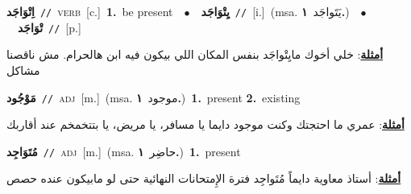 \documentclass[10pt,a4paper,twoside]{article} %
\begin{document}
\begin{multicols}{2}
{{{{{{{{{{\setlength\topsep{0pt}\textbf{\foreignlanguage{arabic}{اِتْوَاجَد}}\ {\color{gray}\texttt{//}\color{black}}\ \textsc{verb}\ [c.]\ \textbf{1.}~be present\ \ $\bullet$\ \ \setlength\topsep{0pt}\textbf{\foreignlanguage{arabic}{يِتْوَاجَد}}\ {\color{gray}\texttt{//}\color{black}}\ [i.]\ \color{gray}(msa. \foreignlanguage{arabic}{يَتَواجَد}~\foreignlanguage{arabic}{\textbf{١.}})\color{black}\ \ $\bullet$\ \ \setlength\topsep{0pt}\textbf{\foreignlanguage{arabic}{تْوَاجَد}}\ {\color{gray}\texttt{//}\color{black}}\ [p.]\  \begin{flushright}\color{gray}\foreignlanguage{arabic}{\textbf{\underline{\foreignlanguage{arabic}{أمثلة}}}: خلي أخوك مايِتْواجَد بنفس المكان اللي بيكون فيه ابن هالحرام. مش ناقصنا مشاكل}\end{flushright}\color{black}} \vspace{2mm}

{\setlength\topsep{0pt}\textbf{\foreignlanguage{arabic}{مَوْجُود}}\ {\color{gray}\texttt{//}\color{black}}\ \textsc{adj}\ [m.]\ \color{gray}(msa. \foreignlanguage{arabic}{موجود}~\foreignlanguage{arabic}{\textbf{١.}})\color{black}\ \textbf{1.}~present  \textbf{2.}~existing\  \begin{flushright}\color{gray}\foreignlanguage{arabic}{\textbf{\underline{\foreignlanguage{arabic}{أمثلة}}}: عمري ما احتجتك وكنت موجود دايما يا مسافر، يا مريض، يا بتتخمخم عند أقاربك}\end{flushright}\color{black}} \vspace{2mm}

{\setlength\topsep{0pt}\textbf{\foreignlanguage{arabic}{مُتَوَاجِد}}\ {\color{gray}\texttt{//}\color{black}}\ \textsc{adj}\ [m.]\ \color{gray}(msa. \foreignlanguage{arabic}{حاضِر}~\foreignlanguage{arabic}{\textbf{١.}})\color{black}\ \textbf{1.}~present\  \begin{flushright}\color{gray}\foreignlanguage{arabic}{\textbf{\underline{\foreignlanguage{arabic}{أمثلة}}}: أستاذ معاوية دايماً مُتَواجِد فترة الإِمتحانات النهائية حتى لو مابيكون عنده حصص}\end{flushright}\color{black}} \vspace{2mm}

}}}}}}}}}
\end{multicols}
\end{document}
